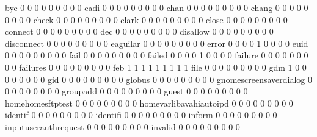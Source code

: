 \documentclass[compress,8pt]{beamer}
\begin{document}
\begin{frame}
\begin{Schunk}
  bye                                        0   0   0   0   0   0   0   0   0
  cadi                                       0   0   0   0   0   0   0   0   0
  chan                                       0   0   0   0   0   0   0   0   0
  chang                                      0   0   0   0   0   0   0   0   0
  check                                      0   0   0   0   0   0   0   0   0
  clark                                      0   0   0   0   0   0   0   0   0
  close                                      0   0   0   0   0   0   0   0   0
  connect                                    0   0   0   0   0   0   0   0   0
  dec                                        0   0   0   0   0   0   0   0   0
  disallow                                   0   0   0   0   0   0   0   0   0
  disconnect                                 0   0   0   0   0   0   0   0   0
  eaguilar                                   0   0   0   0   0   0   0   0   0
  error                                      0   0   0   0   1   0   0   0   0
  euid                                       0   0   0   0   0   0   0   0   0
  fail                                       0   0   0   0   0   0   0   0   0
  failed                                     0   0   0   0   1   0   0   0   0
  failure                                    0   0   0   0   0   0   0   0   0
  failures                                   0   0   0   0   0   0   0   0   0
  feb                                        1   1   1   1   1   1   1   1   1
  file                                       0   0   0   0   0   0   0   0   0
  gdm                                        1   0   0   0   0   0   0   0   0
  gid                                        0   0   0   0   0   0   0   0   0
  globus                                     0   0   0   0   0   0   0   0   0
  gnomescreensaverdialog                     0   0   0   0   0   0   0   0   0
  groupadd                                   0   0   0   0   0   0   0   0   0
  guest                                      0   0   0   0   0   0   0   0   0
  homehomesftptest                           0   0   0   0   0   0   0   0   0
  homevarlibavahiautoipd                     0   0   0   0   0   0   0   0   0
  identif                                    0   0   0   0   0   0   0   0   0
  identifi                                   0   0   0   0   0   0   0   0   0
  inform                                     0   0   0   0   0   0   0   0   0
  inputuserauthrequest                       0   0   0   0   0   0   0   0   0
  invalid                                    0   0   0   0   0   0   0   0   0

\end{Schunk}
\end{frame}
\end{document}
